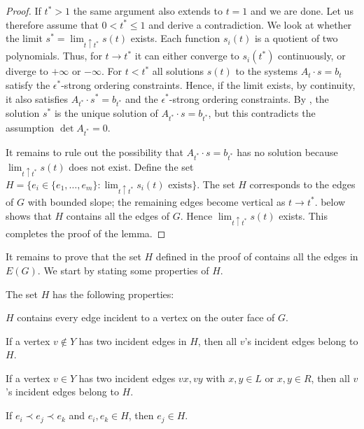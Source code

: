 \begin{proof}
	If $t^*>1$ the same argument also extends to $t=1$ and we are done.
	Let us therefore assume that $0<t^*\le 1$ and derive a contradiction.
	We look at whether the limit $s^*=\lim_{t\uparrow t^*}
	s(t)$ exists.
	Each function $s_i(t)$ is a quotient of two polynomials.
	Thus, for $t\to t^*$ it can either converge to $s_i(t^*)$ continuously, or diverge to $+\infty$ or $-\infty$.
	For $t<t^*$ all solutions $s(t)$ to the systems $A_t\cdot s=b_t$ satisfy the $\epsilon^*$-strong ordering constraints.
	Hence, if the limit exists, by continuity, it also satisfies $A_{t^*}\cdot s^*=b_{t^*}$
	and the $\epsilon^*$-strong ordering constraints.
	By , the solution $s^*$ is
	the unique solution
	of $A_{t^*}\cdot s=b_{t^*}$, but this contradicts the assumption
	$\det A_{t^*}= 0$.
	
	It remains to rule out the possibility that
	$A_{t^*}\cdot s=b_{t^*}$ has no solution because
	$\lim_{t\uparrow t^*} s(t)$ does not exist.  Define the set $H=\{e_i\in
	\{e_1,\ldots,e_m\}:\text{$\lim_{t\uparrow t^*} s_i(t)$ exists}\}$.
	The set $H$ corresponds to the edges of $G$
	with bounded slope; the remaining edges become vertical as $t\to t^*$.
	 below shows that $H$ contains all the edges of $G$. Hence $\lim_{t\uparrow t^*} s(t)$ exists. This completes the proof of the lemma.
\end{proof}


It remains to prove that the set $H$ defined in the proof of  contains all the edges in $E(G)$. We start by stating some properties of $H$.

	\begin{prop}
		The set   $H$ has the following properties: 
		\begin{compactenum}[(PR1)]
			\item $H$ contains every edge incident to a vertex on the outer face of $G$.
			\item \label{off-C}
			If a vertex $v\not\in Y$ has two incident edges in
			$H$,
			then all $v$'s incident edges belong to $H$.
			\item \label{on-C}
			If a vertex $v\in Y$ has two incident edges $vx,vy$ with $x,y\in L$ or $x,y\in R$, then all $v$'s incident edges belong to $H$.
			\item If $e_i \prec e_j \prec e_k$ and $e_i,e_k\in H$, 
			then $e_j\in H$.
		\end{compactenum}
	\end{prop}
		
